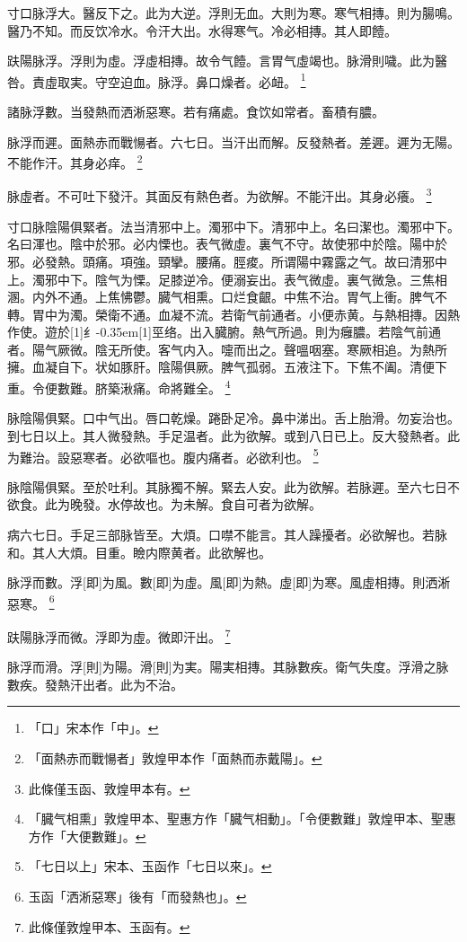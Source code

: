\documentclass[11pt,oneside,b5paper]{ctexbook}
\begin{document}
\begin{flushleft}
寸口脉浮大。醫反下之。此为大逆。浮則无血。大則为寒。寒气相摶。則为腸鳴。醫乃不知。而反饮冷水。令汗大出。水得寒气。冷必相摶。其人即饐。

趺陽脉浮。浮則为虛。浮虛相摶。故令气饐。言胃气虛竭也。脉滑則噦。此为醫咎。責虛取実。守空迫血。脉浮。鼻口燥者。必衄。
\footnote{「口」宋本作「中」。}

諸脉浮數。当發熱而洒淅惡寒。若有痛處。食饮如常者。畜積有膿。

脉浮而遲。面熱赤而戰愓者。六七日。当汗出而解。反發熱者。差遲。遲为无陽。不能作汗。其身必痒。
\footnote{「面熱赤而戰愓者」敦煌甲本作「面熱而赤戴陽」。}

脉虛者。不可吐下發汗。其面反有熱色者。为欲解。不能汗出。其身必癢。
\footnote{此條僅玉函、敦煌甲本有。}

寸口脉陰陽俱緊者。法当清邪中上。濁邪中下。清邪中上。名曰潔也。濁邪中下。名曰渾也。陰中於邪。必内慄也。表气微虛。裏气不守。故使邪中於陰。陽中於邪。必發熱。頭痛。項強。頸攣。腰痛。脛痠。所谓陽中霧露之气。故曰清邪中上。濁邪中下。陰气为慄。足膝逆冷。便溺妄出。表气微虛。裏气微急。三焦相溷。内外不通。上焦怫鬱。臓气相熏。口烂食齦。中焦不治。胃气上衝。脾气不轉。胃中为濁。榮衛不通。血凝不流。若衛气前通者。小便赤黄。与熱相摶。因熱作使。遊於{\hbox{\scalebox{0.68}[1]{纟}\kern-0.35em\scalebox{0.64}[1]{巠}}}络。出入臓腑。熱气所過。則为癰膿。若陰气前通者。陽气厥微。陰无所使。客气内入。嚏而出之。聲嗢咽塞。寒厥相追。为熱所擁。血凝自下。状如豚肝。陰陽俱厥。脾气孤弱。五液注下。下焦不阖。清便下重。令便數難。脐築湫痛。命將難全。
\footnote{「臓气相熏」敦煌甲本、聖惠方作「臓气相動」。「令便數難」敦煌甲本、聖惠方作「大便數難」。}

脉陰陽俱緊。口中气出。唇口乾燥。踡卧足冷。鼻中涕出。舌上胎滑。勿妄治也。到七日以上。其人微發熱。手足温者。此为欲解。或到八日已上。反大發熱者。此为難治。設惡寒者。必欲嘔也。腹内痛者。必欲利也。
\footnote{「七日以上」宋本、玉函作「七日以來」。}

脉陰陽俱緊。至於吐利。其脉獨不解。緊去人安。此为欲解。若脉遲。至六七日不欲食。此为晚發。水停故也。为未解。食自可者为欲解。

病六七日。手足三部脉皆至。大煩。口噤不能言。其人躁擾者。必欲解也。若脉和。其人大煩。目重。瞼内際黄者。此欲解也。

脉浮而數。浮[即]为風。數[即]为虛。風[即]为熱。虛[即]为寒。風虛相摶。則洒淅惡寒。
\footnote{玉函「洒淅惡寒」後有「而發熱也」。}

趺陽脉浮而微。浮即为虛。微即汗出。
\footnote{此條僅敦煌甲本、玉函有。}

脉浮而滑。浮[則]为陽。滑[則]为実。陽実相摶。其脉數疾。衛气失度。浮滑之脉數疾。發熱汗出者。此为不治。


\end{flushleft}
\end{document}
